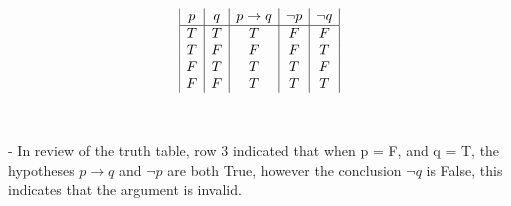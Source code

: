 \documentclass{amsart}
\theoremstyle{definition}
\theoremstyle{Exercise}
\theoremstyle{remark}
\theoremstyle{rule}
\numberwithin{equation}{section}
\begin{document}
\begin{enumerate}[label=(\alph*)]
\begin{displaymath}
\begin{array}{| c | c | c | c | c |}
    p & q & p \to q & \neg p & \neg q\\
    \hline
    T & T & T & F & F\\
    T & F & F & F & T\\
    F & T & T & T & F\\
    F & F & T & T & T\\
  \end{array}
\end{displaymath}
\\\\
- In review of the truth table, row 3 indicated that when p = F, and q = T, the hypotheses $ p \to q $ and $\neg p $ are both True, however the conclusion $\neg q $ is False, this indicates that the argument is invalid. 
\\\\
\end{enumerate}
\end{document}
